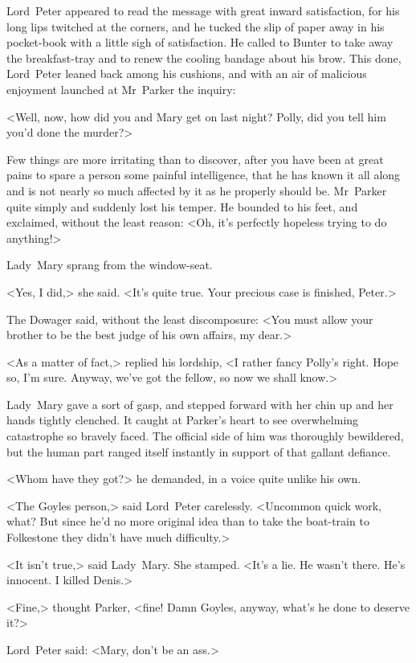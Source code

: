 Lord~Peter appeared to read the message with great inward satisfaction, for his long lips twitched at the corners, and he tucked the slip of paper away in his pocket-book with a little sigh of satisfaction. He called to Bunter to take away the breakfast-tray and to renew the cooling bandage about his brow. This done, Lord~Peter leaned back among his cushions, and with an air of malicious enjoyment launched at Mr~Parker the inquiry:

<Well, now, how did you and Mary get on last night? Polly, did you tell him you'd done the murder?>

Few things are more irritating than to discover, after you have been at great pains to spare a person some painful intelligence, that he has known it all along and is not nearly so much affected by it as he properly should be. Mr~Parker quite simply and suddenly lost his temper. He bounded to his feet, and exclaimed, without the least reason: <Oh, it's perfectly hopeless trying to do anything!>

Lady~Mary sprang from the window-seat.

<Yes, I did,> she said. <It's quite true. Your precious case is finished, Peter.>

The Dowager said, without the least discomposure: <You must allow your brother to be the best judge of his own affairs, my dear.>

<As a matter of fact,> replied his lordship, <I rather fancy Polly's right. Hope so, I'm sure. Anyway, we've got the fellow, so now we shall know.>

Lady~Mary gave a sort of gasp, and stepped forward with her chin up and her hands tightly clenched. It caught at Parker's heart to see overwhelming catastrophe so bravely faced. The official side of him was thoroughly bewildered, but the human part ranged itself instantly in support of that gallant defiance.

<Whom have they got?> he demanded, in a voice quite unlike his own.

<The Goyles person,> said Lord~Peter carelessly. <Uncommon quick work, what? But since he'd no more original idea than to take the boat-train to Folkestone they didn't have much difficulty.>

<It isn't true,> said Lady~Mary. She stamped. <It's a lie. He wasn't there. He's innocent. I killed Denis.>

<Fine,> thought Parker, <fine! Damn Goyles, anyway, what's he done to deserve it?>

Lord~Peter said: <Mary, don't be an ass.>

